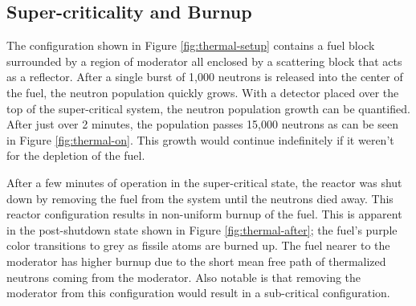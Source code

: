 \documentclass{anstrans}
\begin{document}
\subsection{Super-criticality and Burnup}

The configuration shown in Figure \ref{fig:thermal-setup} contains a fuel
block surrounded by a region of moderator all enclosed by a scattering block
that acts as a reflector.  After a single burst of 1,000 neutrons is released
into the center of the fuel, the neutron population quickly grows.  With a
detector placed over the top of the super-critical system, the neutron
population growth can be quantified. After just over 2 minutes, the population
passes 15,000 neutrons as can be seen in Figure \ref{fig:thermal-on}.  This
growth would continue indefinitely if it weren't for the depletion of the
fuel.

After a few minutes of operation in the super-critical state, the reactor was
shut down by removing the fuel from the system until the neutrons died away.
This reactor configuration results in non-uniform burnup of the fuel. This is
apparent in the post-shutdown state shown in Figure \ref{fig:thermal-after};
the fuel's purple color transitions to grey as fissile atoms are burned up.
The fuel nearer to the moderator has higher burnup due to the short mean free
path of thermalized neutrons coming from the moderator.  Also notable is that
removing the moderator from this configuration would result in a sub-critical
configuration. 
\end{document}

